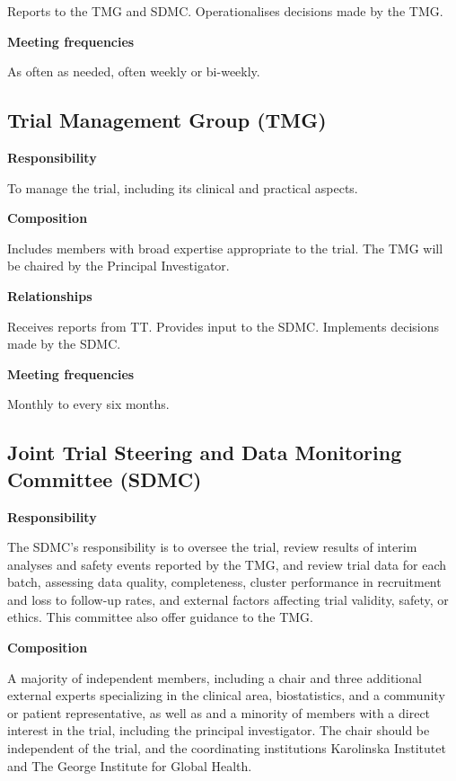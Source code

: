 \documentclass[
]{scrartcl}
\begin{document}
Reports to the TMG and SDMC. Operationalises decisions made by the TMG.

\textbf{Meeting frequencies}

As often as needed, often weekly or bi-weekly.

\subsection{Trial Management Group
(TMG)}\label{trial-management-group-tmg}

\textbf{Responsibility}

To manage the trial, including its clinical and practical aspects.

\textbf{Composition}

Includes members with broad expertise appropriate to the trial. The TMG
will be chaired by the Principal Investigator.

\textbf{Relationships}

Receives reports from TT. Provides input to the SDMC. Implements
decisions made by the SDMC.

\textbf{Meeting frequencies}

Monthly to every six months.

\subsection{Joint Trial Steering and Data Monitoring Committee
(SDMC)}\label{joint-trial-steering-and-data-monitoring-committee-sdmc}

\textbf{Responsibility}

The SDMC's responsibility is to oversee the trial, review results of
interim analyses and safety events reported by the TMG, and review trial
data for each batch, assessing data quality, completeness, cluster
performance in recruitment and loss to follow-up rates, and external
factors affecting trial validity, safety, or ethics. This committee also
offer guidance to the TMG.

\textbf{Composition}

A majority of independent members, including a chair and three
additional external experts specializing in the clinical area,
biostatistics, and a community or patient representative, as well as and
a minority of members with a direct interest in the trial, including the
principal investigator. The chair should be independent of the trial,
and the coordinating institutions Karolinska Institutet and The George
Institute for Global Health.
\end{document}

